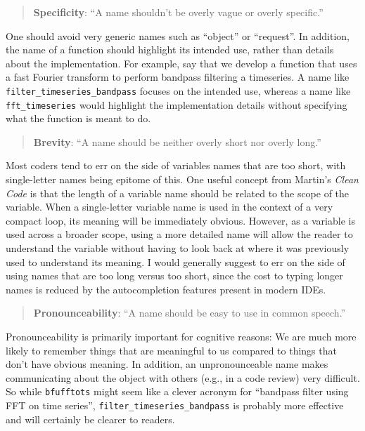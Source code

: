 \begin{quote}
\textbf{Specificity}: ``A name shouldn't be overly vague or overly specific.''
\end{quote}

One should avoid very generic names such as ``object'' or ``request''.
In addition, the name of a function should highlight its intended use, rather than details about the implementation.
For example, say that we develop a function that uses a fast Fourier transform to perform bandpass filtering a timeseries.
A name like \texttt{filter\_timeseries\_bandpass} focuses on the intended use, whereas a name like \texttt{fft\_timeseries} would highlight the implementation details without specifying what the function is meant to do.

\begin{quote}
\textbf{Brevity}: ``A name should be neither overly short nor overly long.''
\end{quote}

Most coders tend to err on the side of variables names that are too short, with single-letter names being epitome of this.
One useful concept from Martin's \textit{Clean Code} is that the length of a variable name should be related to the scope of the variable.
When a single-letter variable name is used in the context of a very compact loop, its meaning will be immediately obvious.
However, as a variable is used across a broader scope, using a more detailed name will allow the reader to understand the variable without having to look back at where it was previously used to understand its meaning.
I would generally suggest to err on the side of using names that are too long versus too short, since the cost to typing longer names is reduced by the autocompletion features present in modern IDEs.

\begin{quote}
\textbf{Pronounceability}: ``A name should be easy to use in common speech.''
\end{quote}

Pronounceability is primarily important for cognitive reasons: We are much more likely to remember things that are meaningful to us compared to things that don't have obvious meaning.
In addition, an unpronounceable name makes communicating about the object with others (e.g., in a code review) very difficult.
So while \texttt{bfufftots} might seem like a clever acronym for ``bandpass filter using FFT on time series'', \texttt{filter\_timeseries\_bandpass} is probably more effective and will certainly be clearer to readers.


